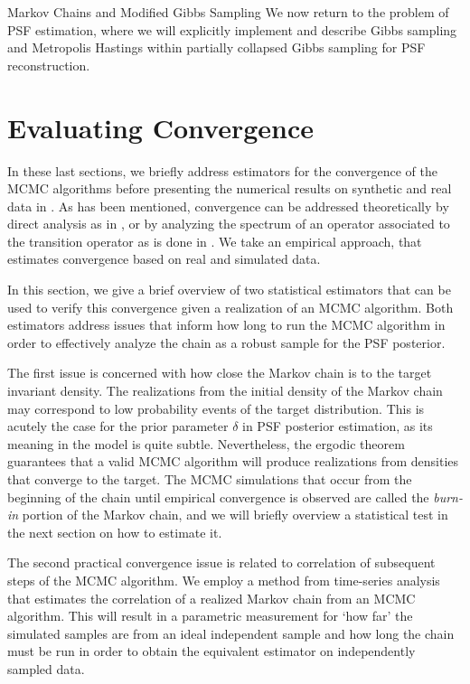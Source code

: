 \begin{chapter}{Markov Chains and Modified Gibbs Sampling}
We now return to the problem of PSF estimation, where we will explicitly implement and describe Gibbs sampling and Metropolis Hastings within partially collapsed Gibbs sampling for PSF reconstruction.

\section{Evaluating Convergence} \label{sec:evaluatingConvergence}

In these last sections, we briefly address estimators for the convergence of the MCMC algorithms before presenting the numerical results on synthetic and real data in .
As has been mentioned, convergence can be addressed theoretically by direct analysis as in \citep{agapiou2014analysis}, or by analyzing the spectrum of an operator associated to the transition operator as is done in \citep{agapiou2014analysis,van2008partially}.
We take an empirical approach, that estimates convergence based on real and simulated data.

In this section, we give a brief overview of two statistical estimators that can be used to verify this convergence given a realization of an MCMC algorithm.
Both estimators address issues that inform how long to run the MCMC algorithm in order to effectively analyze the chain as a robust sample for the PSF posterior. 

The first issue is concerned with how close the Markov chain is to the target invariant density.
The realizations from the initial density of the Markov chain may correspond to low probability events of the target distribution.
This is acutely the case for the prior parameter $\delta$ in PSF posterior estimation, as its meaning in the model is quite subtle.
Nevertheless, the ergodic theorem guarantees that a valid MCMC algorithm will produce realizations from densities that converge to the target.
The MCMC simulations that occur from the beginning of the chain until empirical convergence is observed are called the \emph{burn-in} portion of the Markov chain, and we will briefly overview a statistical test in the next section on how to estimate it.

The second practical convergence issue is related to correlation of subsequent steps of the MCMC algorithm.
We employ a method from time-series analysis that estimates the correlation of a realized Markov chain from an MCMC algorithm.
This will result in a parametric measurement for `how far' the simulated samples are from an ideal independent sample and how long the chain must be run in order to obtain the equivalent estimator on independently sampled data.


\end{chapter}
